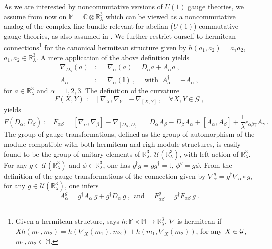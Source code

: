 \documentclass[a4paper,11pt,twoside]{article}
\numberwithin{equation}{section}
\newcommand\bbone{{ \mathbb{I}}}
\theoremstyle{nonumberplain}
\newcounter{and}
\begin{document}
%
As we are interested by noncommutative versions of $U(1)$ gauge theories, we assume from now on $\mathbb{M} = \mathbb{C}\otimes\mathbb{R}^3_\lambda$ which can be viewed as a noncommutative analog of the complex line bundle relevant for abelian ($U(1)$) commutative gauge theories, as also assumed in \cite{gervitwal-13}. We further restrict ourself to hermitean connections{\footnote{Given a hermitean structure, says $h:\mathbb{M}\times\mathbb{M}\to\mathbb{R}^3_\lambda$, $\nabla$ is hermitean if $Xh(m_1,m_2)=h(\nabla_X(m_1),m_2)+h(m_1,\nabla_X(m_2))$, for any $X\in{\cal{G}}$, $m_1,m_2\in\mathbb{M}$.}} for the canonical hermitean structure given by $h(a_1,a_2)=a_1^\dag a_2$, $a_1,a_2 \in \mathbb{R}^3_\lambda$. A mere application of the above definition yields%
%
\begin{eqnarray}
\nabla_{D_\alpha}(a) &:=& \nabla_\alpha(a) = D_\alpha a + A_\alpha a \ , \nonumber \\
A_\alpha &:=& \nabla_\alpha(\bbone) \ , \quad \mbox{ with } \ A_\alpha^\dag = - A_\alpha \ , \label{connection}
\end{eqnarray}
%
for $a\in\mathbb{R}^3_\lambda$ and $\alpha = 1,2,3$. The definition of the curvature 
\begin{equation*}
F(X,Y) := \left[\nabla_X,\nabla_Y\right] - \nabla_{\left[X,Y\right]} \ , \quad \forall X,Y \in \mathcal{G} \ , 
\end{equation*}
%
yields%
%
\begin{equation}
F(D_\alpha,D_\beta) := F_{\alpha\beta} = \left[\nabla_\alpha,\nabla_\beta\right] - \nabla_{\left[D_\alpha,D_\beta\right]} = D_\alpha A_\beta - D_\beta A_\alpha + \left[A_\alpha,A_\beta\right] + \frac{1}{\lambda} \epsilon_{\alpha\beta\gamma} A_\gamma \ . \label{curv1}
\end{equation}
%
The group of gauge transformations, defined as the group of automorphism of the module compatible with both hermitean and righ-module structures, is easily found to be the group of unitary elements of $\mathbb{R}^3_\lambda$, $\mathcal{U}(\mathbb{R}^3_\lambda)$, with left action of $\mathbb{R}^3_\lambda$. For any $g\in\mathcal{U}(\mathbb{R}^3_\lambda)$ and $\phi\in\mathbb{R}^3_\lambda$, one has $g^\dag g=gg^\dag=\bbone$, $\phi^g=g\phi$. From the definition of the gauge transformations of the connection given by $\nabla_\alpha^g=g^\dag\nabla_\alpha\circ g$, for any $g\in\mathcal{U}(\mathbb{R}^3_\lambda)$, one infers%
%
\begin{equation}
A_\alpha^g = g^\dag A_\alpha \ g + g^\dag D_\alpha \ g \ , \ \ \mbox{and } \quad F^g_{\alpha\beta} = g^\dag F_{\alpha\beta} \ g \ .
\end{equation}
\end{document}
